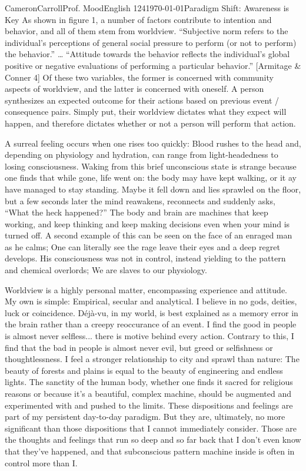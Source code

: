 \documentclass[12pt,letterpaper]{article}
\begin{document}
\begin{mla}{Cameron}{Carroll}{Prof. Mood}{English 124}{\today}{Paradigm Shift: Awareness is Key}
As shown in figure 1, a number of factors contribute to intention and behavior, and all of them stem from worldview.  
``Subjective norm refers to the individual's perceptions of general social pressure to perform (or not to perform) the behavior.'' … ``Attitude towards the behavior reflects the individual's global positive or negative evaluations of performing a particular behavior.'' [Armitage \& Conner 4] Of these two variables, the former is concerned with community aspects of worldview, and the latter is concerned with oneself. A person synthesizes an expected outcome for their actions based on previous event / consequence pairs. Simply put, their worldview dictates what they expect will happen, and therefore dictates whether or not a person will perform that action.

A surreal feeling occurs when one rises too quickly: Blood rushes to the head and, depending on physiology and hydration, can range from light-headedness to losing consciousness. Waking from this brief unconscious state is strange because one finds that while gone, life went on: the body may have kept walking, or it ay have managed to stay standing. Maybe it fell down and lies sprawled on the floor, but a few seconds later the mind reawakens, reconnects and suddenly asks, “What the heck happened?”  The body and brain are machines that keep working, and keep thinking and keep making decisions even when your mind is turned off. A second example of this can be seen on the face of an enraged man as he calms; One can literally see the rage leave their eyes and a deep regret develops. His consciousness was not in control, instead yielding to the pattern and chemical overlords; We are slaves to our physiology.

Worldview is a highly personal matter, encompassing experience and attitude. My own is simple: Empirical, secular and analytical. I believe in no gods, deities, luck or coincidence. D\'{e}j\`{a}-vu, in my world, is best explained as a memory error in the brain rather than a creepy reoccurance of an event. I find the good in people is almost never selfless... there is motive behind every action. Contrary to this, I find that the bad in people is almost never evil, but greed or selfishness or thoughtlessness. I feel a stronger relationship to city and sprawl than nature: The beauty of forests and plains is equal to the beauty of engineering and endless lights. The sanctity of the human body, whether one finds it sacred for religious reasons or because it's a beautiful, complex machine, should be augmented and experimented with and pushed to the limits. These dispositions and feelings are part of my persistent day-to-day paradigm. But they are, ultimately, no more significant than those dispositions that I cannot immediately consider. Those are the thoughts and feelings that run so deep and so far back that I don't even know that they've happened, and that subconscious pattern machine inside is often in control more than I. 


\end{mla}
\end{document}
